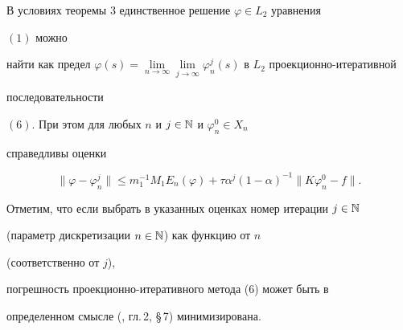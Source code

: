 \begin{thm}


В условиях теоремы $3$ единственное решение $\varphi\in L_2$ уравнения 


$(1)$ можно 


найти как предел $\varphi(s)=\lim\limits_{n\to\infty} 


\lim\limits_{j\to\infty}\varphi^j_n(s)$ в $L_2$ проекционно-итеративной 


последовательности 


$(6)$. При этом для любых $n$ и $j\in\Bbb N$ и $\varphi^0_n\in X_n$ 


справедливы оценки


$$


\|\varphi-\varphi^j_n\|\le m^{-1}_1M_1E_n(\varphi)


+\tau\alpha^j(1-\alpha)^{-1}\|K\varphi^0_n-f\|.


$$


\end{thm}





Отметим, что если выбрать в указанных оценках номер итерации $j\in\Bbb 


N$ 


(параметр дискретизации $n\in\Bbb N$) как функцию от $n$ 


(соответственно от $j$), 


погрешность проекционно-итеративного метода (6) может быть в 


определенном смысле (\cite{12}, гл.\,2, \S\,7) минимизирована.











